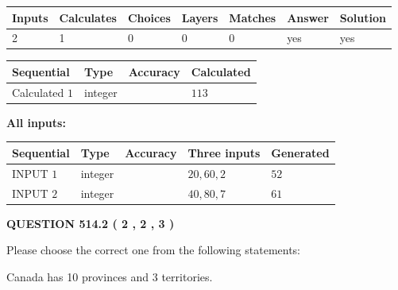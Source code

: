 \documentclass[12pt]{article}
\begin{document}
 

 
   
   
   
   
\noindent\begin{tabular}{|l|l|l|l|l|l|l|}
 \hline
Inputs & Calculates & Choices & Layers & Matches & Answer & Solution \\ \hline
 2  & 
 1  & 
 0
  & 
 0  & 
 0  & 
  yes & 
  yes 
  \\ \hline
 \end{tabular}
   
   
   
   
\noindent{}
   
   
  
  
\noindent\begin{tabular}{|l|l|l|l|}
\hline
 Sequential & Type & Accuracy & Calculated \\ 
\hline
 
 
  Calculated $  1 $ & integer &  & 
  $ 113 $ 
 \\  \hline  
 \end{tabular}
   
   
   
   
\noindent\vspace{0.1in}\hspace{-0.08in} {\textbf{\Large{All inputs: }}}
   
   
  
  
\noindent\begin{tabular}{|l|l|l|l|l|}
\hline
 Sequential & Type & Accuracy & Three inputs & Generated \\ 
\hline
 
 
  INPUT $  1 $ & integer &  & $
 20
 , 
 60
 , 
 2
 $ & $ 52 $ 
 \\  \hline  
 
 
  INPUT $  2 $ & integer &  & $
 40
 , 
 80
 , 
 7
 $ & $ 61 $ 
 \\  \hline  
 \end{tabular}
   
   
  
\vspace{0.2in}
  
{\textbf{\Large{QUESTION
514.2 
 ( 2 , 2 , 3 )
}}}
  
  
Please choose the correct one from the following statements:
 
 
Canada has 10  provinces and 3 territories.
 
\end{document}
